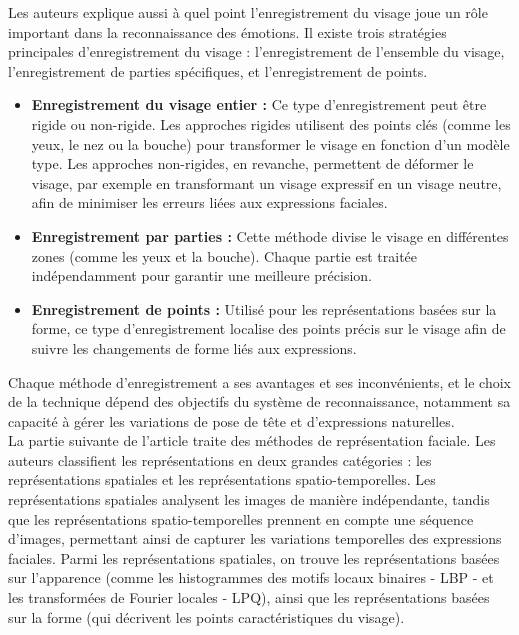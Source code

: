 \documentclass{rapport}
\begin{document}
Les auteurs explique aussi à quel point l'enregistrement du visage joue un rôle
important dans la reconnaissance des émotions. Il existe trois stratégies
principales d'enregistrement du visage : l'enregistrement de l’ensemble du visage,
l’enregistrement de parties spécifiques, et l’enregistrement de points.
\begin{itemize}
    \item \textbf{Enregistrement du visage entier :} Ce type d’enregistrement peut être rigide ou
          non-rigide. Les approches rigides utilisent des points clés (comme les yeux,
          le nez ou la bouche) pour transformer le visage en fonction d’un modèle type.
          Les approches non-rigides, en revanche, permettent de déformer le visage, par
          exemple en transformant un visage expressif en un visage neutre, afin de minimiser
          les erreurs liées aux expressions faciales.
    \item \textbf{Enregistrement par parties :} Cette méthode divise le visage
          en différentes zones (comme les yeux et la bouche). Chaque partie
          est traitée indépendamment pour garantir une meilleure précision.
    \item \textbf{Enregistrement de points :} Utilisé pour les représentations
          basées sur la forme, ce type d'enregistrement localise des points
          précis sur le visage afin de suivre les changements de forme liés
          aux expressions.
\end{itemize}
Chaque méthode d'enregistrement a ses avantages et ses inconvénients, et le choix
de la technique dépend des objectifs du système de reconnaissance, notamment sa
capacité à gérer les variations de pose de tête et d'expressions naturelles.\\

La partie suivante de l'article traite des méthodes de représentation faciale.
Les auteurs classifient les représentations en deux grandes catégories : les
représentations spatiales et les représentations spatio-temporelles. Les
représentations spatiales analysent les images de manière indépendante, tandis que
les représentations spatio-temporelles prennent en compte une séquence d'images,
permettant ainsi de capturer les variations temporelles des expressions faciales.
Parmi les représentations spatiales, on trouve les représentations basées sur
l'apparence (comme les histogrammes des motifs locaux binaires - LBP - et les
transformées de Fourier locales - LPQ), ainsi que les représentations basées sur la
forme (qui décrivent les points caractéristiques du visage).\\
\end{document}
